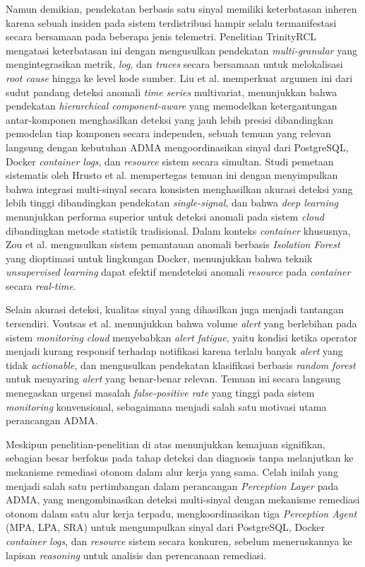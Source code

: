 Namun demikian, pendekatan berbasis satu sinyal memiliki keterbatasan inheren karena sebuah insiden pada sistem terdistribusi hampir selalu termanifestasi secara bersamaan pada beberapa jenis telemetri. Penelitian TrinityRCL \cite{trinity2023} mengatasi keterbatasan ini dengan mengusulkan pendekatan \textit{multi-granular} yang mengintegrasikan metrik, \textit{log}, dan \textit{traces} secara bersamaan untuk melokalisasi \textit{root cause} hingga ke level kode sumber. Liu et al. \cite{liu2025multivariate} memperkuat argumen ini dari sudut pandang deteksi anomali \textit{time series} multivariat, menunjukkan bahwa pendekatan \textit{hierarchical component-aware} yang memodelkan ketergantungan antar-komponen menghasilkan deteksi yang jauh lebih presisi dibandingkan pemodelan tiap komponen secara independen, sebuah temuan yang relevan langsung dengan kebutuhan ADMA mengoordinasikan sinyal dari PostgreSQL, Docker \textit{container logs}, dan \textit{resource} sistem secara simultan. Studi pemetaan sistematis oleh Hrusto et al. \cite{hrusto2025monitoring} mempertegas temuan ini dengan menyimpulkan bahwa integrasi multi-sinyal secara konsisten menghasilkan akurasi deteksi yang lebih tinggi dibandingkan pendekatan \textit{single-signal}, dan bahwa \textit{deep learning} menunjukkan performa superior untuk deteksi anomali pada sistem \textit{cloud} dibandingkan metode statistik tradisional. Dalam konteks \textit{container} khususnya, Zou et al. \cite{zou2022docker} mengusulkan sistem pemantauan anomali berbasis \textit{Isolation Forest} yang dioptimasi untuk lingkungan Docker, menunjukkan bahwa teknik \textit{unsupervised learning} dapat efektif mendeteksi anomali \textit{resource} pada \textit{container} secara \textit{real-time}.

Selain akurasi deteksi, kualitas sinyal yang dihasilkan juga menjadi tantangan tersendiri. Voutsas et al. \cite{voutsas2024mitigating} menunjukkan bahwa volume \textit{alert} yang berlebihan pada sistem \textit{monitoring} \textit{cloud} menyebabkan \textit{alert fatigue}, yaitu kondisi ketika operator menjadi kurang responsif terhadap notifikasi karena terlalu banyak \textit{alert} yang tidak \textit{actionable}, dan mengusulkan pendekatan klasifikasi berbasis \textit{random forest} untuk menyaring \textit{alert} yang benar-benar relevan. Temuan ini secara langsung menegaskan urgensi masalah \textit{false-positive rate} yang tinggi pada sistem \textit{monitoring} konvensional, sebagaimana menjadi salah satu motivasi utama perancangan ADMA.

Meskipun penelitian-penelitian di atas menunjukkan kemajuan signifikan, sebagian besar berfokus pada tahap deteksi dan diagnosis tanpa melanjutkan ke mekanisme remediasi otonom dalam alur kerja yang sama. Celah inilah yang menjadi salah satu pertimbangan dalam perancangan \textit{Perception Layer} pada ADMA, yang mengombinasikan deteksi multi-sinyal dengan mekanisme remediasi otonom dalam satu alur kerja terpadu, mengkoordinasikan tiga \textit{Perception Agent} (MPA, LPA, SRA) untuk mengumpulkan sinyal dari PostgreSQL, Docker \textit{container logs}, dan \textit{resource} sistem secara konkuren, sebelum meneruskannya ke lapisan \textit{reasoning} untuk analisis dan perencanaan remediasi.

